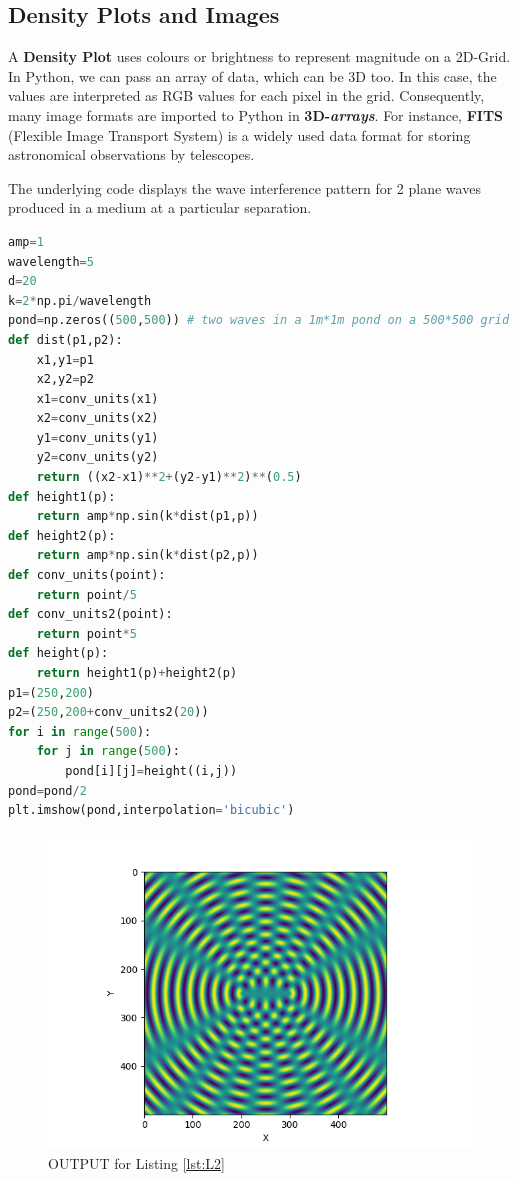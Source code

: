 \subsection{Density Plots and Images}
A \textbf{Density Plot} uses colours or brightness to represent magnitude on a 2D-Grid. In Python, we can pass an array of data, which can be 3D too. In this case, the values are interpreted as RGB values for each pixel in the grid. Consequently, many image formats are imported to Python in \textbf{3D-\textit{arrays}}. For instance, \textbf{FITS} (Flexible Image Transport System) is a widely used data format for storing astronomical observations by telescopes.\\
\par The underlying code displays the wave interference pattern for 2 plane waves produced in a medium at a particular separation.
\begin{lstlisting}[language=Python, caption=Interfernce Pattern, frame=single, label={lst:L2} ]
amp=1
wavelength=5
d=20
k=2*np.pi/wavelength
pond=np.zeros((500,500)) # two waves in a 1m*1m pond on a 500*500 grid
def dist(p1,p2):
	x1,y1=p1
	x2,y2=p2
	x1=conv_units(x1)
	x2=conv_units(x2)
	y1=conv_units(y1)
	y2=conv_units(y2)
	return ((x2-x1)**2+(y2-y1)**2)**(0.5)
def height1(p):
	return amp*np.sin(k*dist(p1,p))
def height2(p):
	return amp*np.sin(k*dist(p2,p))
def conv_units(point):
	return point/5
def conv_units2(point):
	return point*5
def height(p):
	return height1(p)+height2(p)
p1=(250,200)
p2=(250,200+conv_units2(20))
for i in range(500):
	for j in range(500):
		pond[i][j]=height((i,j))
pond=pond/2
plt.imshow(pond,interpolation='bicubic')
\end{lstlisting}
\begin{figure}[H]
	\centering
	\includegraphics[width=0.7\linewidth]{WaveInterference}
	\caption{OUTPUT for Listing \ref{lst:L2}}
	\label{fig:waveinterference}
\end{figure}